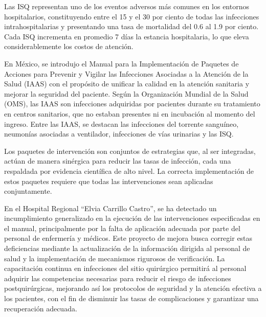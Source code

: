 Las ISQ representan uno de los eventos adversos más comunes en los entornos hospitalarios, constituyendo entre el 15 y el 30 por ciento de todas las infecciones intrahospitalarias y presentando una tasa de mortalidad del 0.6 al 1.9 por ciento. Cada ISQ incrementa en promedio 7 días la estancia hospitalaria, lo que eleva considerablemente los costos de atención.

En México, se introdujo el Manual para la Implementación de Paquetes de Acciones para Prevenir y Vigilar las Infecciones Asociadas a la Atención de la Salud (IAAS) con el propósito de unificar la calidad en la atención sanitaria y mejorar la seguridad del paciente. Según la Organización Mundial de la Salud (OMS), las IAAS son infecciones adquiridas por pacientes durante su tratamiento en centros sanitarios, que no estaban presentes ni en incubación al momento del ingreso. Entre las IAAS, se destacan las infecciones del torrente sanguíneo, neumonías asociadas a ventilador, infecciones de vías urinarias y las ISQ.

Los paquetes de intervención son conjuntos de estrategias que, al ser integradas, actúan de manera sinérgica para reducir las tasas de infección, cada una respaldada por evidencia científica de alto nivel. La correcta implementación de estos paquetes requiere que todas las intervenciones sean aplicadas conjuntamente.

En el Hospital Regional ``Elvia Carrillo Castro'', se ha detectado un incumplimiento generalizado en la ejecución de las intervenciones especificadas en el manual, principalmente por la falta de aplicación adecuada por parte del personal de enfermería y médicos. Este proyecto de mejora busca corregir estas deficiencias mediante la actualización de la información dirigida al personal de salud y la implementación de mecanismos rigurosos de verificación. La capacitación continua en infecciones del sitio quirúrgico permitirá al personal adquirir las competencias necesarias para reducir el riesgo de infecciones postquirúrgicas, mejorando así los protocolos de seguridad y la atención efectiva a los pacientes, con el fin de disminuir las tasas de complicaciones y garantizar una recuperación adecuada.